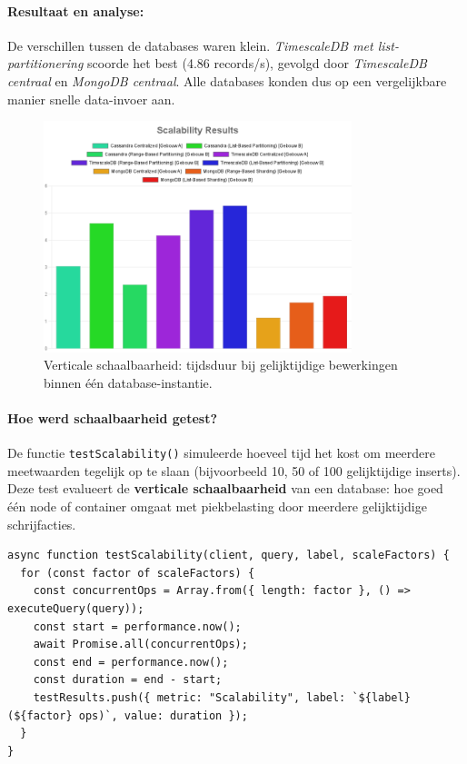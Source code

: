 \paragraph{Resultaat en analyse:}
De verschillen tussen de databases waren klein. \textit{TimescaleDB met list-partitionering} scoorde het best (4.86 records/s), gevolgd door \textit{TimescaleDB centraal} en \textit{MongoDB centraal}. Alle databases konden dus op een vergelijkbare manier snelle data-invoer aan.

\begin{figure}[H]
	\centering
	\includegraphics[width=0.8\textwidth]{Scalability.png}
	\caption{Verticale schaalbaarheid: tijdsduur bij gelijktijdige bewerkingen binnen één database-instantie.}
	\label{fig:scalability-comparison}
\end{figure}

\paragraph{Hoe werd schaalbaarheid getest?}
De functie \texttt{testScalability()} simuleerde hoeveel tijd het kost om meerdere meetwaarden tegelijk op te slaan (bijvoorbeeld 10, 50 of 100 gelijktijdige inserts). Deze test evalueert de \textbf{verticale schaalbaarheid} van een database: hoe goed één node of container omgaat met piekbelasting door meerdere gelijktijdige schrijfacties.

\begin{verbatim}
async function testScalability(client, query, label, scaleFactors) {
  for (const factor of scaleFactors) {
    const concurrentOps = Array.from({ length: factor }, () => executeQuery(query));
    const start = performance.now();
    await Promise.all(concurrentOps);
    const end = performance.now();
    const duration = end - start;
    testResults.push({ metric: "Scalability", label: `${label} (${factor} ops)`, value: duration });
  }
}
\end{verbatim}

